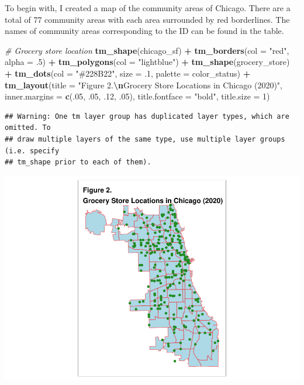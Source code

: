 \documentclass[
]{article}
\newenvironment{Shaded}{\begin{snugshade}}{\end{snugshade}}
\newcommand{\AttributeTok}[1]{\textcolor[rgb]{0.13,0.29,0.53}{#1}}
\newcommand{\CommentTok}[1]{\textcolor[rgb]{0.56,0.35,0.01}{\textit{#1}}}
\newcommand{\DecValTok}[1]{\textcolor[rgb]{0.00,0.00,0.81}{#1}}
\newcommand{\FunctionTok}[1]{\textcolor[rgb]{0.13,0.29,0.53}{\textbf{#1}}}
\newcommand{\NormalTok}[1]{#1}
\newcommand{\SpecialCharTok}[1]{\textcolor[rgb]{0.81,0.36,0.00}{\textbf{#1}}}
\newcommand{\StringTok}[1]{\textcolor[rgb]{0.31,0.60,0.02}{#1}}
\begin{document}
To begin with, I created a map of the community areas of Chicago. There
are a total of 77 community areas with each area surrounded by red
borderlines. The names of community areas corresponding to the ID can be
found in the table.

\begin{Shaded}
\begin{Highlighting}[]
\CommentTok{\# Grocery store location}
\FunctionTok{tm\_shape}\NormalTok{(chicago\_sf) }\SpecialCharTok{+}
  \FunctionTok{tm\_borders}\NormalTok{(}\AttributeTok{col =} \StringTok{"red"}\NormalTok{, }\AttributeTok{alpha =}\NormalTok{ .}\DecValTok{5}\NormalTok{) }\SpecialCharTok{+}
  \FunctionTok{tm\_polygons}\NormalTok{(}\AttributeTok{col =} \StringTok{"lightblue"}\NormalTok{) }\SpecialCharTok{+}
  \FunctionTok{tm\_shape}\NormalTok{(grocery\_store) }\SpecialCharTok{+}
  \FunctionTok{tm\_dots}\NormalTok{(}\AttributeTok{col =} \StringTok{"\#228B22"}\NormalTok{,}
          \AttributeTok{size =}\NormalTok{ .}\DecValTok{1}\NormalTok{,}
          \AttributeTok{palette =}\NormalTok{ color\_status) }\SpecialCharTok{+}
  \FunctionTok{tm\_layout}\NormalTok{(}\AttributeTok{title =} \StringTok{"Figure 2.}\SpecialCharTok{\textbackslash{}n}\StringTok{Grocery Store Locations in Chicago (2020)"}\NormalTok{,}
            \AttributeTok{inner.margins =} \FunctionTok{c}\NormalTok{(.}\DecValTok{05}\NormalTok{, .}\DecValTok{05}\NormalTok{, .}\DecValTok{12}\NormalTok{, .}\DecValTok{05}\NormalTok{),}
            \AttributeTok{title.fontface =} \StringTok{"bold"}\NormalTok{,}
            \AttributeTok{title.size =} \DecValTok{1}\NormalTok{)}
\end{Highlighting}
\end{Shaded}

\begin{verbatim}
## Warning: One tm layer group has duplicated layer types, which are omitted. To
## draw multiple layers of the same type, use multiple layer groups (i.e. specify
## tm_shape prior to each of them).
\end{verbatim}

\includegraphics[width=0.5\linewidth]{Sam-Song_Coding-Sample_files/figure-latex/unnamed-chunk-4-1}
\end{document}
